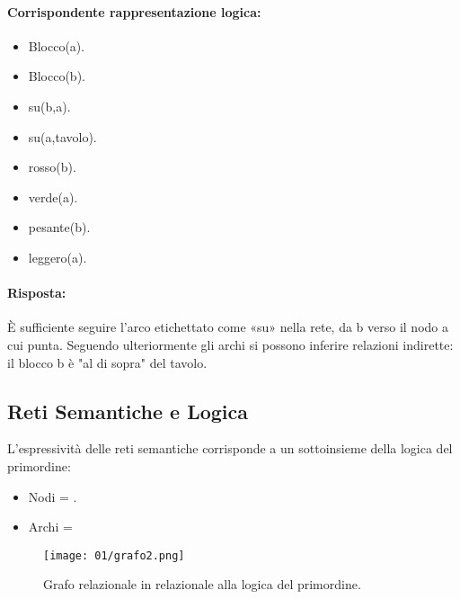\paragraph{Corrispondente rappresentazione logica:}

\begin{itemize}
  \item Blocco(a). 
  \item Blocco(b). 
  \item su(b,a). 
  \item su(a,tavolo). 
  \item rosso(b). 
  \item verde(a). 
  \item pesante(b). 
  \item leggero(a).
\end{itemize}



\paragraph{Risposta:} È sufficiente seguire l’arco etichettato come «su» nella rete,
da b verso il nodo a cui punta. Seguendo ulteriormente gli archi si possono inferire relazioni
indirette: il blocco b è "al di sopra" del tavolo.

\subsection{Reti Semantiche e Logica}

L’espressività delle reti semantiche corrisponde a un sottoinsieme della logica del primordine:

\begin{itemize}
  \item Nodi = . 
  \item Archi = 
\end{itemize}

\begin{figure}[h]
    \centering
    \texttt{[image: 01/grafo2.png]}
    \caption{Grafo relazionale in relazionale alla logica del primordine.}
\end{figure}


